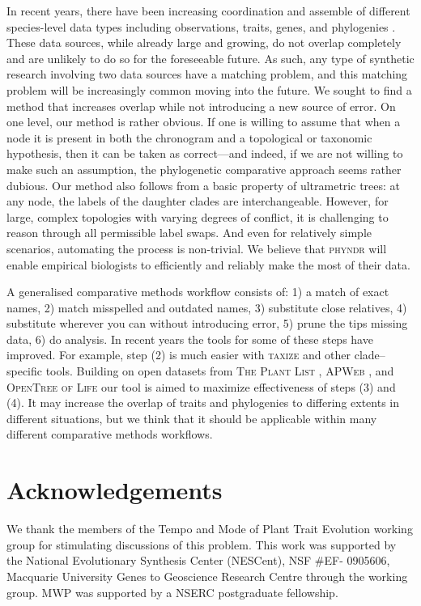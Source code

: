 \documentclass[a4paper,11pt]{article}
\begin{document}
In recent years, there have been increasing coordination and assemble of different species-level data types including observations, traits, genes, and phylogenies \citep{Parr2012}.  These data sources, while already large and growing, do not overlap completely and are unlikely to do so for the foreseeable future.  As such, any type of synthetic research involving two data sources have a matching problem, and this matching problem will be increasingly common moving into the future.  We sought to find a method that increases overlap while not introducing a new source of error.  On one level, our method is rather obvious. If one is willing to assume that when a node it is present in both the chronogram and a topological or taxonomic hypothesis, then it can be taken as correct---and indeed, if we are not willing to make such an assumption, the phylogenetic comparative approach seems rather dubious.  Our method also follows from a basic property of ultrametric trees: at any node, the labels of the daughter clades are interchangeable. However, for large, complex topologies with varying degrees of conflict, it is challenging to reason through all permissible label swaps. And even for relatively simple scenarios, automating the process is non-trivial. We believe that \textsc{phyndr} will enable empirical biologists to efficiently and reliably make the most of their data.

A generalised comparative methods workflow consists of:  1) a match of exact names, 2) match misspelled and outdated names, 3) substitute close relatives, 4) substitute wherever you can without introducing error, 5) prune the tips missing data, 6) do analysis.  In recent years the tools for some of these steps have improved.  For example, step (2) is much easier with \textsc{taxize} \citep{taxize} and other clade--specific tools.  Building on open datasets from \textsc{The Plant List} \citep{ThePlantList}, \textsc{APWeb} \citep{apweb}, and \textsc{OpenTree of Life} \citet{OpenTree} our tool is aimed to maximize effectiveness of steps (3) and (4).  It may increase the overlap of traits and phylogenies to differing extents in different situations, but we think that it should be applicable within many different comparative methods workflows.

\section{Acknowledgements}
We thank the members of the Tempo and Mode of Plant Trait
Evolution working group for stimulating discussions of this problem. This work was supported by the National Evolutionary Synthesis Center
(NESCent), NSF \#EF- 0905606, Macquarie University Genes to Geoscience
Research Centre through the working group. MWP was supported by a NSERC postgraduate fellowship.


\clearpage



\end{document}
